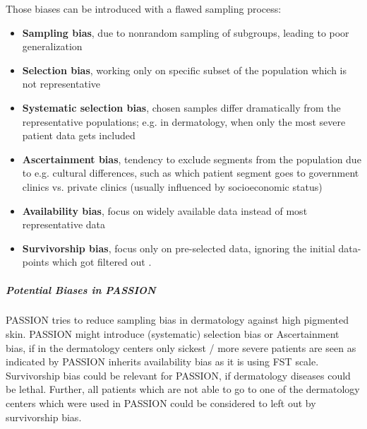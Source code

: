 \documentclass[12pt, a4paper, oneside]{book}   	%
\begin{document}
				Those biases can be introduced with a flawed sampling process:
				\begin{itemize}
					\item \textbf{Sampling bias}, due to nonrandom sampling of subgroups, leading to poor generalization \autocite{Mehrabi_2021}
					\item \textbf{Selection bias}, working only on specific subset of the population which is not representative \autocites{Mester_2022}{Chakraborty_2024}
					\item \textbf{Systematic selection bias}, chosen samples differ dramatically from the representative populations; e.g. in dermatology, when only the most severe patient data gets included \autocite{Chakraborty_2024, c5,c6,c33}
					\item \textbf{Ascertainment bias}, tendency to exclude segments from the population due to e.g. cultural differences, such as which patient segment goes to government clinics vs. private clinics (usually influenced by socioeconomic status) \autocite{Chakraborty_2024, c5}
					\item \textbf{Availability bias}, focus on widely available data instead of most representative data \autocites{Chakraborty_2024, c9, c10}{}
					\item \textbf{Survivorship bias}, focus only on pre-selected data, ignoring the initial data-points which got filtered out \autocite{Mester_2022}.
				\end{itemize}
				
				
				\subparagraph{Potential Biases in PASSION}
				PASSION tries to reduce sampling bias in dermatology against high pigmented skin.
				PASSION might introduce (systematic) selection bias or Ascertainment bias, if in the dermatology centers only sickest / more severe patients are seen as indicated by \textcite{Chakraborty_2024}
				PASSION inherits availability bias as it is using \gls{FST} scale.
				Survivorship bias could be relevant for PASSION, if dermatology diseases could be lethal. Further, all patients which are not able to go to one of the dermatology centers which were used in PASSION could be considered to left out by survivorship bias.
				
\end{document}
